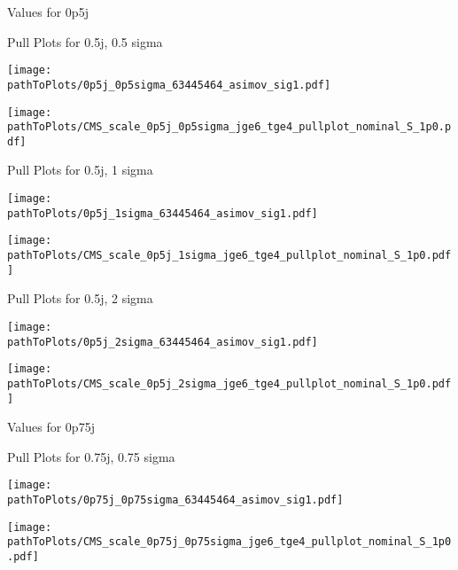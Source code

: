 \begin{frame}{Values for 0p5j}

\end{frame}

\begin{frame}{Pull Plots for 0.5j, 0.5 sigma}
\begin{minipage}{0.48\textwidth}
\centering
\texttt{[image: \\pathToPlots/0p5j\_0p5sigma\_63445464\_asimov\_sig1.pdf]}
\end{minipage}
\hfill
\begin{minipage}{0.48\textwidth}
\texttt{[image: \\pathToPlots/CMS\_scale\_0p5j\_0p5sigma\_jge6\_tge4\_pullplot\_nominal\_S\_1p0.pdf]}
\end{minipage}
\end{frame}

\begin{frame}{Pull Plots for 0.5j, 1 sigma}
\begin{minipage}{0.48\textwidth}
\centering
\texttt{[image: \\pathToPlots/0p5j\_1sigma\_63445464\_asimov\_sig1.pdf]}
\end{minipage}
\hfill
\begin{minipage}{0.48\textwidth}
\texttt{[image: \\pathToPlots/CMS\_scale\_0p5j\_1sigma\_jge6\_tge4\_pullplot\_nominal\_S\_1p0.pdf]}
\end{minipage}
\end{frame}


\begin{frame}{Pull Plots for 0.5j, 2 sigma}
\begin{minipage}{0.48\textwidth}
\centering
\texttt{[image: \\pathToPlots/0p5j\_2sigma\_63445464\_asimov\_sig1.pdf]}
\end{minipage}
\hfill
\begin{minipage}{0.48\textwidth}
\texttt{[image: \\pathToPlots/CMS\_scale\_0p5j\_2sigma\_jge6\_tge4\_pullplot\_nominal\_S\_1p0.pdf]}
\end{minipage}
\end{frame}

\begin{frame}{Values for 0p75j}

\end{frame}

\begin{frame}{Pull Plots for 0.75j, 0.75 sigma}
\begin{minipage}{0.48\textwidth}
\centering
\texttt{[image: \\pathToPlots/0p75j\_0p75sigma\_63445464\_asimov\_sig1.pdf]}
\end{minipage}
\hfill
\begin{minipage}{0.48\textwidth}
\texttt{[image: \\pathToPlots/CMS\_scale\_0p75j\_0p75sigma\_jge6\_tge4\_pullplot\_nominal\_S\_1p0.pdf]}
\end{minipage}
\end{frame}


